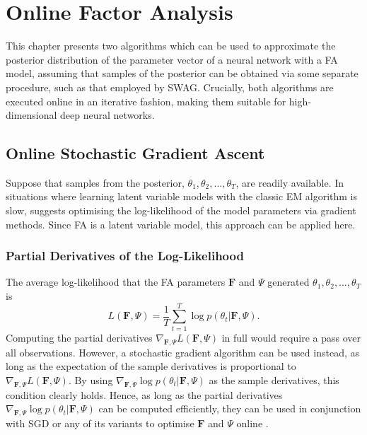 \documentclass[msc,deptreport.inf]{infthesis} %
\newcommand{\matr}[1]{\mathbf{#1}}
\begin{document}
\chapter{Online Factor Analysis}\label{ch:online_fa}

This chapter presents two algorithms which can be used to approximate the posterior distribution of the parameter vector of a neural network with a FA model, assuming that samples of the posterior can be obtained via some separate procedure, such as that employed by SWAG. Crucially, both algorithms are executed online in an iterative fashion, making them suitable for high-dimensional deep neural networks.

\section{Online Stochastic Gradient Ascent}\label{sec:gradient_fa}

Suppose that samples from the posterior, $\theta_1, \theta_2, \dots,\theta_T$, are readily available. In situations where learning latent variable models with the classic EM algorithm is slow, \cite{barber2007} suggests optimising the log-likelihood of the model parameters via gradient methods. Since FA is a latent variable model, this approach can be applied here.

\subsection{Partial Derivatives of the Log-Likelihood}

The average log-likelihood that the FA parameters $\matr{F}$ and $\Psi$ generated $\theta_1, \theta_2, \dots,\theta_T$ is
\begin{equation}
	L(\matr{F}, \Psi) = \frac{1}{T} \sum_{t=1}^T \log p(\theta_t | \matr{F}, \Psi).
\end{equation}
Computing the partial derivatives $\nabla_{\matr{F}, \Psi} L(\matr{F}, \Psi)$ in full would require a pass over all observations. However, a stochastic gradient algorithm can be used instead, as long as the expectation of the sample derivatives is proportional to $\nabla_{\matr{F}, \Psi} L(\matr{F}, \Psi)$. By using $\nabla_{\matr{F}, \Psi} \log p(\theta_t | \matr{F}, \Psi)$ as the sample derivatives, this condition clearly holds. Hence, as long as the partial derivatives $\nabla_{\matr{F}, \Psi} \log p(\theta_t | \matr{F}, \Psi)$ can be computed efficiently, they can be used in conjunction with SGD or any of its variants to optimise $\matr{F}$ and $\Psi$ online \cite{brownlie2021}. 
\end{document}
